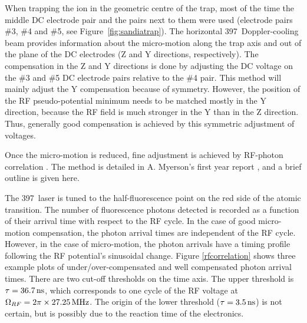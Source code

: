 When trapping the ion in the geometric centre of the trap, most of the time the middle DC electrode pair and the pairs next to them were used (electrode pairs \#3, \#4 and \#5, see Figure~\ref{fig:sandiatrap}). The horizontal 397\nm\, Doppler-cooling beam provides information about the micro-motion along the trap axis and out of the plane of the DC electrodes (Z and Y directions, respectively). The compensation in the Z and Y directions is done by adjusting the DC voltage on the \#3 and \#5 DC electrode pairs relative to the \#4 pair. This method will mainly adjust the Y compensation because of symmetry. However, the position of the RF pseudo-potential minimum needs to be matched mostly in the Y direction, because the RF field is much stronger in the Y than in the Z direction. Thus, generally good compensation is achieved by this symmetric adjustment of voltages.

Once the micro-motion is reduced, fine adjustment is achieved by RF-photon correlation \cite{Stacey2003}. The method is detailed in A. Myerson's first year report \cite{Myerson2007}, and a brief outline is given here.

The 397\nm\, laser is tuned to the half-fluorescence point on the red side of the atomic transition. The number of fluorescence photons detected is recorded as a function of their arrival time with respect to the RF cycle. In the case of good micro-motion compensation, the photon arrival times are independent of the RF cycle. However, in the case of micro-motion, the photon arrivals have a timing profile following the RF potential's sinusoidal change. Figure \ref{rfcorrelation} shows three example plots of under/over-compensated and well compensated photon arrival times. There are two cut-off thresholds on the time axis. The upper threshold is $\tau = 36.7\,\mbox{ns}$, which corresponds to one cycle of the RF voltage at $\Omega_{RF} = 2\pi \times 27.25\,\mbox{MHz}$. The origin of the lower threshold ($\tau =3.5\,\mbox{ns}$) is not certain, but is possibly due to the reaction time of the electronics.

